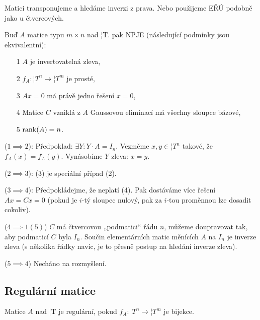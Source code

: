 \documentclass[12pt]{article}					%
\begin{document}
        \begin{poznamka}
            Matici transponujeme a hledáme inverzi z prava. Nebo použijeme EŘÚ podobně jako u čtvercových.
        \end{poznamka}

        \begin{tvrzeni}[(4.70)]
                Buď $A$ matice typu $m\times n$ nad ¦T. pak NPJE (následující podmínky jsou ekvivalentní):
            \begin{itemize}
                \item[1] $A$ je invertovatelná zleva,
                \item[2] $f_A: ¦T^n \rightarrow ¦T^m$ je prosté,
                \item[3] $Ax = 0$ má právě jedno řešení $x=0$,
                \item[4] Matice $C$ vzniklá z $A$ Gaussovou eliminací má všechny sloupce bázové,
                \item[5] $\operatorname{rank}(A) = n$.
            \end{itemize}

            \begin{dukazin}
                ($1\implies 2$): Předpoklad: $\exists Y: Y·A = I_n$. Vezměme $x, y \in ¦T^n$ takové, že $f_A(x) = f_A(y)$. Vynásobíme $Y$ zleva: $x=y$.

                ($2 \implies 3$): (3) je speciální případ (2).

                ($3 \implies 4$): Předpokládejme, že neplatí (4). Pak dostáváme více řešení $Ax=Cx=0$ (pokud je $i$-tý sloupec nulový, pak za $i$-tou proměnnou lze dosadit cokoliv).

                ($4\implies 1 (5)$) $C$ má čtvercovou „podmatici“ řádu $n$, můžeme doupravovat tak, aby podmaticí $C$ byla $I_n$. Součin elementárních matic měnících $A$ na $I_n$ je inverze zleva (s několika řádky navíc, je to přesně postup na hledání inverze zleva).

                ($5\implies 4$) Necháno na rozmyšlení.
            \end{dukazin}
        \end{tvrzeni}

    \subsection{Regulární matice}
        \begin{definice}
            Matice $A$ nad ¦T je regulární, pokud $f_A: ¦T^n \rightarrow ¦T^m$ je bijekce.
        \end{definice}
\end{document}
